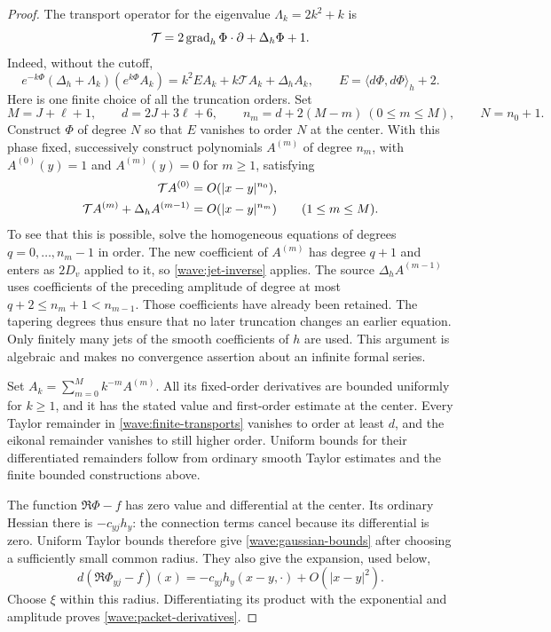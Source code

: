 \begin{proof}
The transport operator for the eigenvalue $\Lambda_k=2k^2+k$ is
\[
 \mathcal T=2\operatorname{grad}_h\Phi\cdot\partial+\Delta_h\Phi+1.
\]
Indeed, without the cutoff,
\begin{equation}
 e^{-k\Phi}(\Delta_h+\Lambda_k)(e^{k\Phi}A_k)
 =k^2E A_k+k\mathcal T A_k+\Delta_h A_k,
 \qquad E=\langle d\Phi,d\Phi\rangle_h+2.
 \label{wave:transport-identity}
\end{equation}
Here is one finite choice of all the truncation orders. Set
\[
 M=J+\ell+1,\qquad d=2J+3\ell+6,\qquad
 n_m=d+2(M-m)\ (0\le m\le M),\qquad N=n_0+1.
\]
Construct $\Phi$ of degree $N$ so that $E$ vanishes to order $N$
at the center. With this phase fixed, successively construct polynomials
$A^{(m)}$ of degree $n_m$, with $A^{(0)}(y)=1$ and
$A^{(m)}(y)=0$ for $m\ge1$, satisfying
\begin{align}
 \mathcal T A^{(0)}&=O(|x-y|^{n_0}),\notag\\
 \mathcal T A^{(m)}+\Delta_h A^{(m-1)}
     &=O(|x-y|^{n_m})\qquad(1\le m\le M).
 \label{wave:finite-transports}
\end{align}
To see that this is possible, solve the homogeneous equations of degrees
$q=0,\ldots,n_m-1$ in order. The new coefficient of $A^{(m)}$ has
degree $q+1$ and enters as $2D_v$ applied to it, so
\eqref{wave:jet-inverse} applies. The source
$\Delta_h A^{(m-1)}$ uses coefficients of the preceding amplitude of
degree at most $q+2\le n_m+1<n_{m-1}$. Those coefficients have already
been retained. The tapering degrees thus ensure that no later
truncation changes an earlier equation. Only finitely many jets of
the smooth coefficients of $h$ are used. This argument is algebraic
and makes no convergence assertion about an infinite formal series.

Set $A_k=\sum_{m=0}^M k^{-m}A^{(m)}$. All its fixed-order derivatives
are bounded uniformly for $k\ge1$, and it has the stated value and
first-order estimate at the center. Every Taylor remainder in
\eqref{wave:finite-transports} vanishes to order at least $d$, and the
eikonal remainder vanishes to still higher order. Uniform bounds for
their differentiated remainders follow from ordinary smooth Taylor
estimates and the finite bounded constructions above.

The function $\Re\Phi-f$ has zero value and differential at the
center. Its ordinary Hessian there is $-c_{yj}h_y$: the connection
terms cancel because its differential is zero. Uniform Taylor bounds
therefore give \eqref{wave:gaussian-bounds} after choosing a sufficiently
small common radius. They also give the expansion, used below,
\begin{equation}
 d(\Re\Phi_{yj}-f)(x)
 =-c_{yj}h_y(x-y,\cdot)+O(|x-y|^2).
 \label{wave:phase-expansion}
\end{equation}
Choose $\xi$ within this radius. Differentiating its product with the
exponential and amplitude proves \eqref{wave:packet-derivatives}.


\end{proof}
